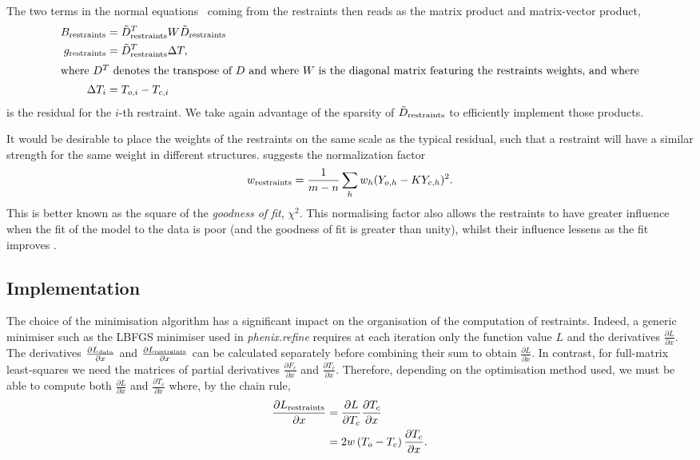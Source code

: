 \documentclass[pdf]{iucr}
\newcommand{\partialder}[2]{\frac{\partial #1}{\partial #2}}
\begin{document}
The two terms in the normal equations~ coming from the restraints then reads as the matrix product and matrix-vector product,
\begin{align}
B_{\text{restraints}} &= \tilde{D}_{\text{restraints}}^T W \tilde{D}_{\text{restraints}}\\
g_{\text{restraints}} &= \tilde{D}_{\text{restraints}}^T \Delta T,\\
\shortintertext{where $D^T$ denotes the transpose of $D$ and where $W$ is the diagonal matrix featuring the restraints weights, and where}
\Delta T_i &= T_{o,i} - T_{c,i}
\end{align}
is the residual for the $i$-th restraint. We take again advantage of the sparsity of $\tilde{D}_{\text{restraints}}$ to efficiently implement those products.

It would be desirable to place the weights of the restraints on the same scale as the typical residual, such that a restraint will have a similar strength for the same weight in different structures.  suggests the normalization factor
\begin{align}
w_{\text{restraints}} = \frac{1}{m-n} \sum_{h}{ w_h (Y_{o,h} - K Y_{c,h})^2}.
\label{eqn:giacovazzo_normalisation}
\end{align}
This is better known as the square of the \emph{goodness of fit}, $\chi^2$. This normalising factor also allows the restraints to have greater influence when the fit of the model to the data is poor (and the goodness of fit is greater than unity), whilst their influence lessens as the fit improves .

\subsection{Implementation}

The choice of the minimisation algorithm has a significant impact on the organisation of the computation of restraints. Indeed, a generic minimiser such as the LBFGS minimiser used in \emph{phenix.refine}  requires at each iteration only the function value $L$ and the derivatives $\partialder{L}{x}$. The derivatives $\partialder{L_\data}{x}$ and $\partialder{L_\restraints}{x}$ can be calculated separately before combining their sum to obtain $\partialder{L}{x}$. In contrast, for full-matrix least-squares we need the matrices of partial derivatives $\partialder{F_c}{x}$ and $\partialder{T_c}{x}$. Therefore, depending on the optimisation method used, we must be able to compute both $\partialder{L}{x}$ and $\partialder{T_c}{x}$ where, by the chain rule,
\begin{align}
\partialder{L_\restraints}{x} &= \partialder{L}{T_c} \partialder{T_c}{x} \nonumber\\
                             &= 2 w \left(T_o - T_c \right) \partialder{T_c}{x}.
\end{align}
\end{document}
